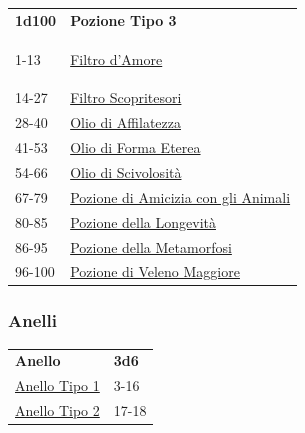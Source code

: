 \begin{multicols}{2}
{\medskip

{\small\begin{tabular}{ll}
\textbf{1d100} & \textbf{Pozione Tipo 3}\\\hypertarget{Pozione Tipo 3}{}
1-13& \hyperlink{Filtrod'Amore}{Filtro d'Amore}\\
14-27 & \hyperlink{FiltroScopritesori}{Filtro Scopritesori}\\
28-40 & \hyperlink{OliodiAffilatezza}{Olio di Affilatezza}\\
41-53 & \hyperlink{OliodiFormaEterea}{Olio di Forma Eterea}\\
54-66 & \hyperlink{OliodiScivolosità}{Olio di Scivolosità}\\
67-79 & \hyperlink{PozionediAmiciziacongliAnimali}{Pozione di Amicizia con gli Animali}\\
80-85 & \hyperlink{PozionedellaLongevità}{Pozione della Longevità}\\
86-95 & \hyperlink{PozionedellaMetamorfosi}{Pozione della Metamorfosi}\\
96-100&\hyperlink{pozionifiltri}{Pozione di Veleno Maggiore}
\end{tabular}}

\subsubsection{Anelli}\hypertarget{anellimagici}{}\label{anellimagici}

{\small\begin{tabular}{ll}
\textbf{Anello}&\textbf{3d6}\\
\hyperlink{Pozione Tipo 3}{Anello Tipo 1} &3-16\\
\hyperlink{Pozione Tipo 3}{Anello Tipo 2} &17-18
\end{tabular}}

\medskip

}
\end{multicols}
